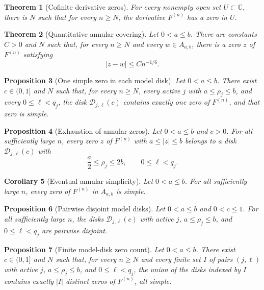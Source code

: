 \documentclass[11pt,reqno]{amsart}
\numberwithin{equation}{section}
\newtheorem{theorem}{Theorem}[section]
\newtheorem{proposition}[theorem]{Proposition}
\newtheorem{corollary}[theorem]{Corollary}
\theoremstyle{remark}
\newcommand{\C}{\mathbb C}
\newcommand{\Aab}{A_{a,b}}
\begin{document}
\begin{theorem}[Cofinite derivative zeros]\label{thm:cofinite}
For every nonempty open set $U\subset\C$, there is $N$ such that for every $n\ge N$, the derivative $F^{(n)}$ has a zero in $U$.
\end{theorem}

\begin{theorem}[Quantitative annular covering]\label{thm:covering}
Let $0<a\le b$.  There are constants $C>0$ and $N$ such that, for every $n\ge N$ and every $w\in\Aab$, there is a zero $z$ of $F^{(n)}$ satisfying
\begin{equation}\label{eq:coveringrate}
 |z-w|\le Cn^{-1/6}.
\end{equation}
\end{theorem}

\begin{proposition}[One simple zero in each model disk]\label{prop:modeldisk}
Let $0<a\le b$.  There exist $c\in(0,1]$ and $N$ such that, for every $n\ge N$, every active $j$ with $a\le\rho_j\le b$, and every $0\le\ell<q_j$, the disk $\mathcal D_{j,\ell}(c)$ contains exactly one zero of $F^{(n)}$, and that zero is simple.
\end{proposition}

\begin{proposition}[Exhaustion of annular zeros]\label{prop:exclusion}
Let $0<a\le b$ and $c>0$.  For all sufficiently large $n$, every zero $z$ of $F^{(n)}$ with $a\le |z|\le b$ belongs to a disk $\mathcal D_{j,\ell}(c)$ with
\[
 \frac a2\le\rho_j\le2b,
 \qquad 0\le\ell<q_j.
\]
\end{proposition}

\begin{corollary}[Eventual annular simplicity]\label{cor:simplicity}
Let $0<a\le b$.  For all sufficiently large $n$, every zero of $F^{(n)}$ in $\Aab$ is simple.
\end{corollary}

\begin{proposition}[Pairwise disjoint model disks]\label{prop:disjoint}
Let $0<a\le b$ and $0<c\le1$.  For all sufficiently large $n$, the disks $\mathcal D_{j,\ell}(c)$ with active $j$, $a\le\rho_j\le b$, and $0\le\ell<q_j$ are pairwise disjoint.
\end{proposition}

\begin{proposition}[Finite model-disk zero count]\label{prop:count}
Let $0<a\le b$.  There exist $c\in(0,1]$ and $N$ such that, for every $n\ge N$ and every finite set $I$ of pairs $(j,\ell)$ with active $j$, $a\le\rho_j\le b$, and $0\le\ell<q_j$, the union of the disks indexed by $I$ contains exactly $|I|$ distinct zeros of $F^{(n)}$, all simple.
\end{proposition}
\end{document}
